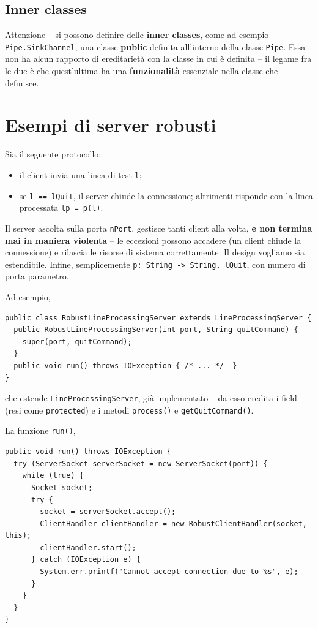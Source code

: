 \documentclass[\fontsizeclass,twocolumn]{\classname}
\theoremstyle{definition}
\theoremstyle{definition}
\begin{document}
\subsection{Inner classes}

Attenzione -- si possono definire delle \textbf{inner classes}, come ad esempio
\texttt{Pipe\-.Sink\-Channel}, una classe \textbf{public} definita all'interno
della classe \texttt{Pipe}. Essa non ha alcun rapporto di ereditarietà con la
classe in cui è definita -- il legame fra le due è che quest'ultima ha una
\textbf{funzionalità} essenziale nella classe che definisce.

\section{Esempi di server robusti}

Sia il seguente protocollo:
\begin{itemize}
    \item il client invia una linea di test \texttt{l};
    \item se \texttt{l == lQuit}, il server chiude la connessione; altrimenti
        risponde con la linea processata \texttt{lp = p(l)}.
\end{itemize}

Il server ascolta sulla porta \texttt{nPort}, gestisce tanti client alla volta,
\textbf{e non termina mai in maniera violenta} -- le eccezioni possono accadere
(un client chiude la connessione) e rilascia le risorse di sistema
correttamente. Il design vogliamo sia estendibile. Infine, semplicemente
\texttt{p: String -> String, lQuit}, con numero di porta parametro.

Ad esempio,

\begin{lstlisting}
public class RobustLineProcessingServer extends LineProcessingServer {
  public RobustLineProcessingServer(int port, String quitCommand) {
    super(port, quitCommand);
  }
  public void run() throws IOException { /* ... */  }
}
\end{lstlisting}

che estende \texttt{LineProcessing\-Server}, già implementato -- da esso eredita
i field (resi come \texttt{protected}) e i metodi \texttt{process()} e
\texttt{getQuitCommand()}.

La funzione \texttt{run()},

\begin{lstlisting}
public void run() throws IOException {
  try (ServerSocket serverSocket = new ServerSocket(port)) {
    while (true) {
      Socket socket;
      try {
        socket = serverSocket.accept();
        ClientHandler clientHandler = new RobustClientHandler(socket, this);
        clientHandler.start();
      } catch (IOException e) {
        System.err.printf("Cannot accept connection due to %s", e);
      }
    }
  }
}
\end{lstlisting}
\end{document}
